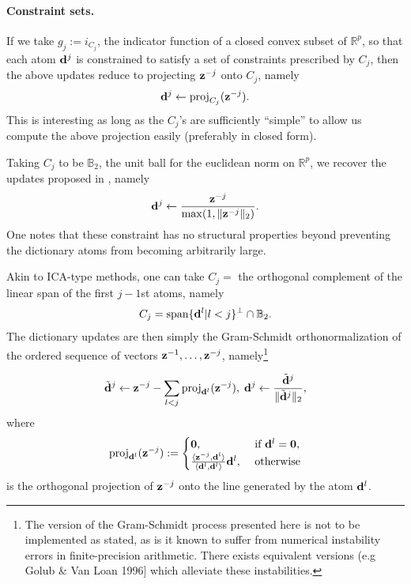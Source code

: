 \paragraph{Constraint sets.}
If we take $g_j := i_{C_j}$, the indicator function of a closed convex subset of $\mathbb R^p$, so that each atom $\mathbf{d}^j$ is constrained to satisfy a set of constraints prescribed by $C_j$, then the above updates reduce to projecting $\mathbf{z}^{-j}$ onto $C_j$, namely
\begin{equation}
\mathbf{d}^j \leftarrow  \text{proj}_{C_j}(\mathbf{z}^{-j}).
\end{equation}
This is interesting as long as the $C_j$'s are sufficiently ``simple'' to allow us compute the above projection easily (preferably in closed form).

Taking $C_j$ to be $\mathbb B_2$, the unit ball for the euclidean norm on  $\mathbb R^p$, we recover the updates proposed in \citep{mairal2009,mairal2010}, namely
\begin{equation}
\mathbf{d}^j \leftarrow  \frac{\mathbf{z}^{-j}}{\max(1,\|\mathbf{z}^{-j}\|_2)}.
\end{equation}
One notes that these constraint has no structural properties beyond preventing the dictionary atoms from becoming arbitrarily large.

Akin to ICA-type methods, one can take $C_j =$ the orthogonal complement of the linear span of the first $j-1$st atoms, namely
  \begin{equation}
    C_{j} = \text{span}\{\mathbf{d}^l | l < j\}^\perp \cap \mathbb B_{2}.
  \end{equation}
  The dictionary updates are then simply the Gram-Schmidt orthonormalization of the ordered sequence of vectors $\mathbf{z}^{-1},\ldots,\mathbf{z}^{-j}$, namely\footnote{The version of the Gram-Schmidt process presented here is not to be implemented as stated, as is it known to suffer from numerical instability errors in finite-precision arithmetic. There exists equivalent versions (e.g Golub \& Van Loan 1996] which alleviate these instabilities.}

  \begin{eqnarray}
    \tilde{\mathbf{d}}^j \leftarrow \mathbf{z}^{-j} -\sum_{l < j}\operatorname{proj}_{\mathbf{d}^l}(\mathbf{z}^{-j}),\;\mathbf{d}^j \leftarrow \frac{\tilde{\mathbf{d}}^j}{\|\tilde{\mathbf{d}}^j\|_2},
  \end{eqnarray}
  where
  $$
  \operatorname{proj}_{\mathbf{d}^l}(\mathbf{z}^{-j}) := \begin{cases}\textbf{0},&\mbox{ if }\mathbf{d}^l = \textbf{0},\\
    \frac{\langle \mathbf{z}^{-j},\mathbf{d}^l\rangle}{\langle \mathbf{d}^l,\mathbf{d}^l\rangle}\mathbf{d}^l,&\mbox{ otherwise}
  \end{cases}
  $$
  is the orthogonal projection of $\mathbf{z}^{-j}$ onto the line generated by the atom  $\mathbf{d}^l$.
  

